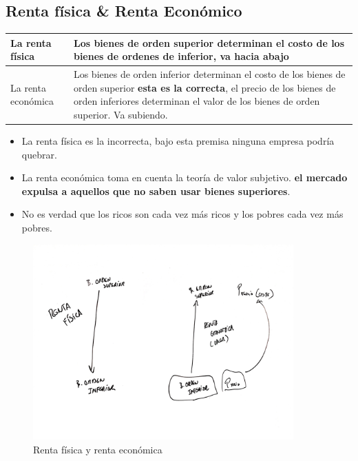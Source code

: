 \subsection{Renta física \& Renta Económico}
\begin{tabular}{ | p{5cm} | p{5cm} |}
    \hline
    La renta física & Los bienes de orden superior determinan el costo de los bienes de ordenes de inferior, va hacia abajo  \\ 
    \hline
    La renta económica & Los bienes de orden inferior determinan el costo de los bienes de orden superior \textbf{esta es la correcta}, el precio de los bienes de orden inferiores determinan el valor de  los bienes de orden superior. Va subiendo.\\ 
    \hline
\end{tabular}



\begin{itemize}
    \item La renta física es la incorrecta, bajo esta premisa ninguna empresa podría quebrar.
    \item La renta económica toma en cuenta la teoría de valor subjetivo. \textbf{el mercado expulsa a aquellos que no saben usar bienes superiores}.
    \item No es verdad que los ricos son cada vez más ricos y los pobres cada vez más pobres.
\end{itemize}


\begin{figure}[htbp]
    \centering
    \includegraphics[width=10cm]{Classes/Images/2019-09-02-01.jpg}
    \caption{Renta física y renta económica}
    \label{}
\end{figure} 
